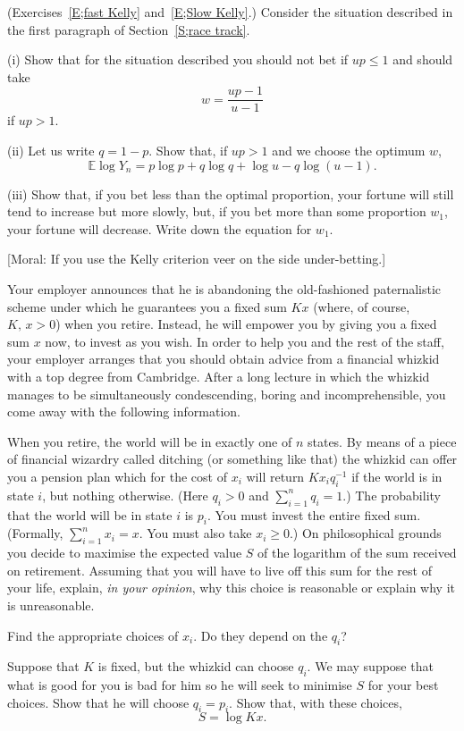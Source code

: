 \begin{question}\label{C2.8} 
(Exercises~\ref{E;fast Kelly}
and~\ref{E;Slow Kelly}.) Consider the situation
described in the first paragraph of Section~\ref{S;race track}.

(i) Show that for the situation described
you should not bet if $up\leq 1$ and should take
\[w=\frac{up-1}{u-1}\]
if $up>1$.

(ii) Let us write $q=1-p$. Show that, if $up>1$ and we choose
the optimum $w$,
\[{\mathbb E}\log Y_{n}=p\log p+q\log q+\log u-q\log(u-1).\]

(iii) Show that,
if you bet less than the optimal proportion, your fortune
will still tend to increase but more slowly, but, if you bet
more than some proportion $w_{1}$, your fortune will decrease.
Write down the equation for $w_{1}$.

[Moral: If you use the Kelly criterion veer on the side under-betting.]
\end{question}
\begin{question}\label{C2.9} Your employer announces that he is
abandoning the old-fashioned paternalistic scheme
under which he guarantees you a fixed sum $Kx$
(where, of course, $K,\,x>0$)
when you retire. Instead, he will empower you by
giving you a fixed sum $x$ now, to invest as you wish.
In order to help you
and the rest of the staff, your employer  
arranges that you should obtain advice 
from a financial whizkid with a top degree
from Cambridge. After a long lecture in which the whizkid
manages to be simultaneously condescending, boring
and incomprehensible, you come away with the following information.

When you retire,  the world will be in exactly
one of $n$ states. By means of a piece of financial
wizardry called ditching (or something like that)
the whizkid can offer you a pension plan which
for the cost of $x_{i}$ will return $Kx_{i}q_{i}^{-1}$
if the world is in state $i$, but nothing otherwise.
(Here  $q_{i}> 0$ and $\sum_{i=1}^{n}q_{i}=1$.)
The probability that the world will be in state $i$
is $p_{i}$. You must invest the entire fixed
sum. (Formally, $\sum_{i=1}^{n}x_{i}=x$. You must also take
$x_{i}\geq 0$.) On philosophical grounds you decide
to maximise the expected value $S$ of the logarithm
of the sum received on retirement.
Assuming that you will have to live
off this sum for the rest of your life,
explain, \emph{in your opinion}, why this choice is
reasonable or explain why it is unreasonable.

Find the appropriate choices of $x_{i}$.
Do they depend on the $q_{i}$?

Suppose that $K$ is fixed, but the whizkid can choose
$q_{i}$. We may suppose that what is good for you is bad for him
so
he will seek to minimise $S$ for your best choices.  
Show that he will choose $q_{i}=p_{i}$.
Show that,
with these choices,
\[S=\log Kx.\]
\end{question}

